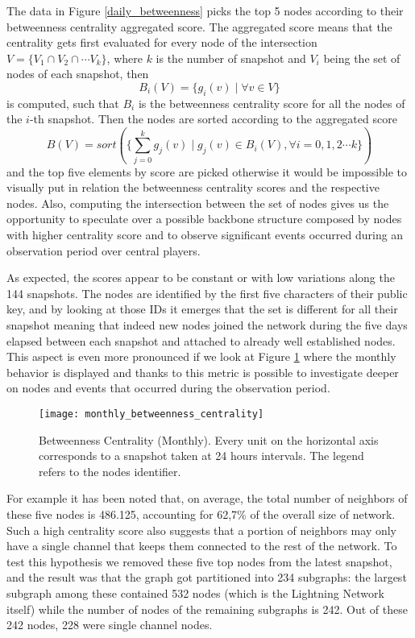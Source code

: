 	The data in Figure \ref{daily_betweenness} picks the top 5 nodes according to their betweenness centrality aggregated score. The aggregated score means that the centrality gets first evaluated for every node of the intersection $V = \{V_1 \cap V_2 \cap \cdots V_k \}$, where $k$ is the number of snapshot and $V_i$ being the set of nodes of each snapshot, then
	\begin{equation}\label{eq:betwenness}
		B_i(V) = \{ g_i(v) \mid \forall v \in V \}
	\end{equation}
	is computed, such that $B_i$ is the betweenness centrality score for all the nodes of the $i$-th snapshot. Then the nodes are sorted according to the aggregated score
	\begin{equation}
		B(V) = sort(\{ \sum_{j = 0}^{k}g_j(v) \mid g_j(v) \in B_i(V), \forall i= 0,1,2 \cdots k\})
	\end{equation}
	and the top five elements by score are picked otherwise it would be impossible to visually put in relation the betweenness centrality scores and the respective nodes. Also, computing the intersection between the set of nodes gives us the opportunity to speculate over a possible backbone structure composed by nodes with higher centrality score and to observe significant events occurred during an observation period over central players.
	
	As expected, the scores appear to be constant or with low variations along the 144 snapshots. The nodes are identified by the first five characters of their public key, and by looking at those IDs it emerges that the set is different for all their snapshot meaning that indeed new nodes joined the network during the five days elapsed between each snapshot and attached to already well established nodes. This aspect is even more pronounced if we look at Figure \ref{monthly_betweenness_centrality} where the monthly behavior is displayed and thanks to this metric is possible to investigate deeper on nodes and events that occurred during the observation period. 
	
	\begin{figure}[ht!]
		\centering
		\texttt{[image: monthly\_betweenness\_centrality]}
		\caption{Betweenness Centrality (Monthly). Every unit on the horizontal axis corresponds to a snapshot taken at 24 hours intervals. The legend refers to the nodes identifier.}
		\label{monthly_betweenness_centrality}
	\end{figure}		
	
	For example it has been noted that, on average, the total number of neighbors of these five nodes is 486.125, accounting for 62,7\% of the overall size of network. Such a high centrality score also suggests that a portion of neighbors may only have a single channel that keeps them connected to the rest of the network. To test this hypothesis we removed these five top nodes from the latest snapshot, and the result was that the graph got partitioned into 234 subgraphs: the largest subgraph among these contained 532 nodes (which is the Lightning Network itself) while the number of nodes of the remaining subgraphs is 242. Out of these 242 nodes, 228 were single channel nodes.

